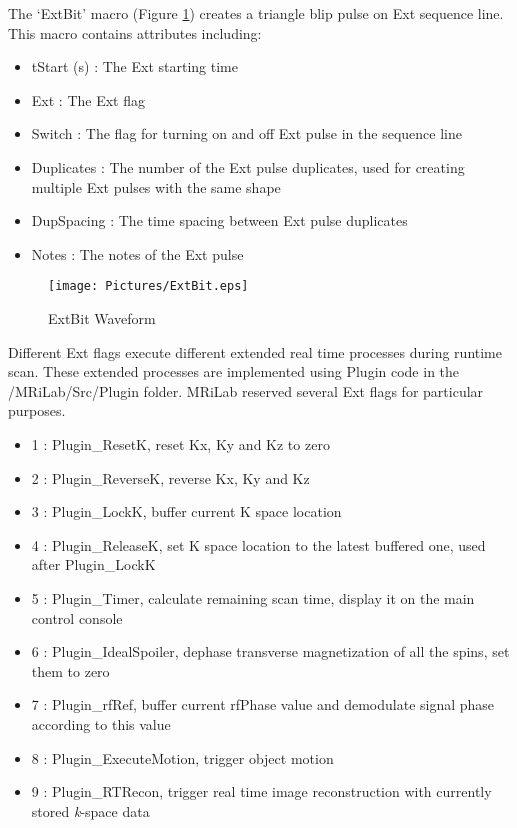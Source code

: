 \documentclass{book}%
\begin{document}
The `ExtBit' macro (Figure \ref{fig:ExtBit}) creates a triangle blip pulse on Ext sequence line. This macro contains attributes including:

\begin{itemize}
	\item tStart (s) : The Ext starting time
	\item Ext : The Ext flag
	\item Switch : The flag for turning on and off Ext pulse in the sequence line
	\item Duplicates : The number of the Ext pulse duplicates, used for creating multiple Ext pulses with the same shape
	\item DupSpacing : The time spacing between Ext pulse duplicates
	\item Notes : The notes of the Ext pulse 
\end{itemize}

\begin{figure}[htbp]
	\centering
		\texttt{[image: Pictures/ExtBit.eps]}
	\caption{ExtBit Waveform}
	\label{fig:ExtBit}
\end{figure}


Different Ext flags execute different extended real time processes during runtime scan. These extended processes are implemented using Plugin code in the /MRiLab/Src/Plugin folder. MRiLab reserved several Ext flags for particular purposes. 

\begin{itemize}
	\item 1 : Plugin\_ResetK, reset Kx, Ky and Kz to zero
	\item 2 : Plugin\_ReverseK, reverse Kx, Ky and Kz
	\item 3 : Plugin\_LockK, buffer current K space location
	\item 4 : Plugin\_ReleaseK, set K space location to the latest buffered one, used after Plugin\_LockK
	\item 5 : Plugin\_Timer, calculate remaining scan time, display it on the main control console
	\item 6 : Plugin\_IdealSpoiler, dephase transverse magnetization of all the spins, set them to zero
	\item 7 : Plugin\_rfRef, buffer current rfPhase value and demodulate signal phase according to this value
	\item 8 : Plugin\_ExecuteMotion, trigger object motion
	\item 9 : Plugin\_RTRecon, trigger real time image reconstruction with currently stored \textit{k}-space data
\end{itemize}
\end{document}
